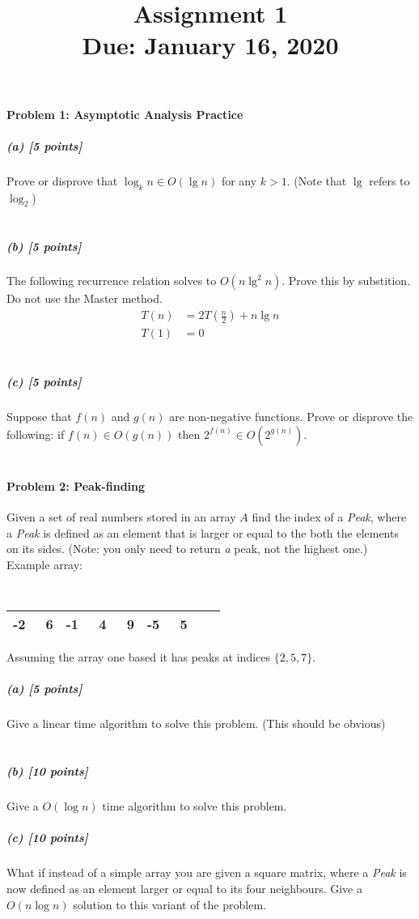\documentclass[11pt]{article}
\title{\bf Assignment 1 \\[2ex]
\rm\normalsize Due: January 16, 2020}
\date{}
\author{}
\begin{document}
\maketitle

\paragraph{Problem 1: Asymptotic Analysis Practice}
\subparagraph{(a) [5 points]}
Prove or disprove that $\log_k n \in O(\lg n)$ for any $k > 1$. (Note that $\lg$ refers to $\log_2$) \\

\\
\subparagraph{(b) [5 points]}
The following recurrence relation solves to $O(n \lg^2 n)$. Prove this by substition. Do not use the Master method.
\begin{align*}
T(n) &= 2T\left( \frac n2 \right) + n \lg n \\
T(1) &= 0
\end{align*}
\\

\subparagraph{(c) [5 points]}
Suppose that $f(n)$ and $g(n)$ are non-negative functions. Prove or disprove the following: if $f(n) \in O(g(n))$ then $2^{f(n)} \in O(2^{g(n)})$. \\
\\


\paragraph{Problem 2: Peak-finding}
Given a set of real numbers stored in an array $A$ find the index of a {\em Peak}, where a {\em Peak} is defined as an
element that is larger or equal to the both the elements on its sides. (Note: you only need to return {\em a} peak, not
the highest one.)\\

Example array:
                {\tt
                \begin{tabular}{|*{9}{r|}}
                    \hline
                    -2 & \ 6 & -1 & \ 4 & \ 9 & -5 & \ 5  \\
                    \hline
                \end{tabular}
                }

Assuming the array one based it has peaks at indices $\{2,5,7 \}$.

\subparagraph{(a) [5 points]}
Give a linear time algorithm to solve this problem. (This should be obvious) \\
\\


\subparagraph{(b) [10 points]}
Give a $O(\log n)$ time algorithm to solve this problem.



\subparagraph{(c) [10 points]}
What if instead of a simple array you are given a square matrix, where a {\em Peak} is now defined as an element larger
or equal to its four neighbours. Give a $O(n \log n)$ solution to this variant of the problem.
\\

\end{document}
